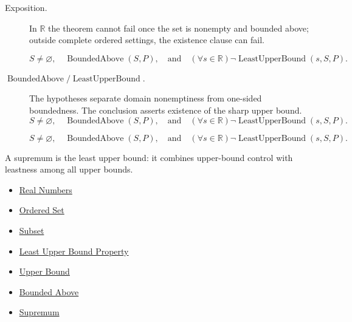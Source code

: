 \begin{remark*}
\begin{description}
  \item[Exposition.]
  In $\mathbb{R}$ the theorem cannot fail once the set is nonempty and
  bounded above; outside complete ordered settings, the existence clause
  can fail.

  
\[
S\neq\varnothing,\quad
  \operatorname{BoundedAbove}(S,P),
  \quad\text{and}\quad
  (\forall s\in\mathbb{R})\neg\operatorname{LeastUpperBound}(s,S,P).
\]
  \item[\(\operatorname{BoundedAbove} / \operatorname{LeastUpperBound}.\)]
  The hypotheses separate domain nonemptiness from one-sided boundedness.
  The conclusion asserts existence of the sharp upper bound.
  \[
    S\neq\varnothing,\quad
    \operatorname{BoundedAbove}(S,P),
    \quad\text{and}\quad
    (\forall s\in\mathbb{R})\neg\operatorname{LeastUpperBound}(s,S,P).
  \]

\[
    S\neq\varnothing,\quad
    \operatorname{BoundedAbove}(S,P),
    \quad\text{and}\quad
    (\forall s\in\mathbb{R})\neg\operatorname{LeastUpperBound}(s,S,P).
  \]
\end{description}
\end{remark*}

\begin{remark*}[Interpretation]
A supremum is the least upper bound: it combines upper-bound control with leastness among all upper bounds.
\end{remark*}

\begin{dependencies}
\begin{itemize}
  \item \hyperref[def:reals]{Real Numbers}
  \item \hyperref[def:ordered-set]{Ordered Set}
  \item \hyperref[def:subset]{Subset}
  \item \hyperref[def:least-upper-bound-property]{Least Upper Bound Property}
  \item \hyperref[def:real-upper-bound]{Upper Bound}
  \item \hyperref[def:bounded-above]{Bounded Above}
  \item \hyperref[def:supremum]{Supremum}
\end{itemize}
\end{dependencies}

